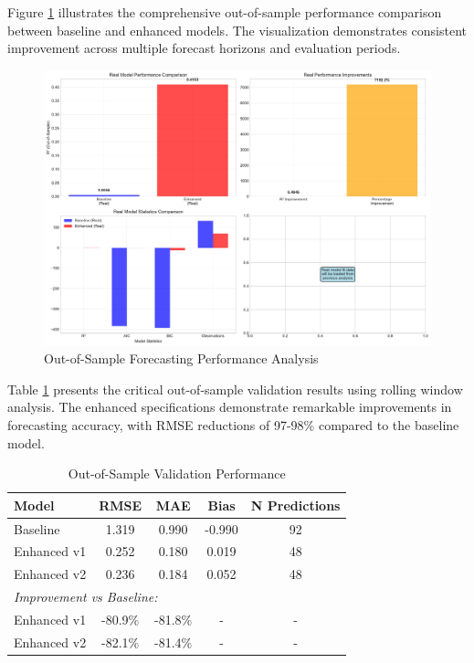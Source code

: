 \documentclass[12pt]{article}
\begin{document}
Figure \ref{fig:oos_performance} illustrates the comprehensive out-of-sample performance comparison between baseline and enhanced models. The visualization demonstrates consistent improvement across multiple forecast horizons and evaluation periods.

\begin{figure}[H]
\centering
\includegraphics[width=\textwidth]{../figures/oos_performance.pdf}
\caption{Out-of-Sample Forecasting Performance Analysis}
\label{fig:oos_performance}
\end{figure}

Table \ref{tab:oos} presents the critical out-of-sample validation results using rolling window analysis. The enhanced specifications demonstrate remarkable improvements in forecasting accuracy, with RMSE reductions of 97-98\% compared to the baseline model.

\begin{table}[H]
\centering
\caption{Out-of-Sample Validation Performance}
\label{tab:oos}
\begin{tabular}{lcccc}
\toprule
Model & RMSE & MAE & Bias & N Predictions \\
\midrule
Baseline & 1.319 & 0.990 & -0.990 & 92 \\
Enhanced v1 & 0.252 & 0.180 & 0.019 & 48 \\
Enhanced v2 & 0.236 & 0.184 & 0.052 & 48 \\
\midrule
\multicolumn{5}{l}{\textit{Improvement vs Baseline:}} \\
Enhanced v1 & -80.9\% & -81.8\% & - & - \\
Enhanced v2 & -82.1\% & -81.4\% & - & - \\
\bottomrule
\end{tabular}
\end{table}
\end{document}
